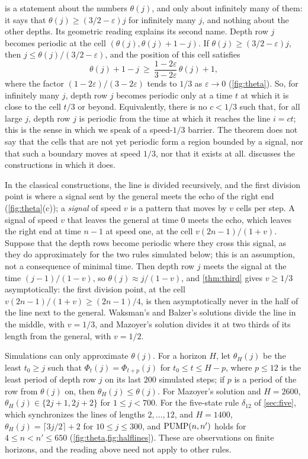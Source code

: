  is a statement about the numbers $\theta(j)$, and only about
infinitely many of them: it says that $\theta(j)\ge(3/2-\varepsilon)j$ for
infinitely many $j$, and nothing about the other depths. Its geometric reading
explains its second name. Depth row $j$ becomes periodic at the cell
$(\theta(j),\theta(j)+1-j)$. If $\theta(j)\ge(3/2-\varepsilon)j$, then
$j\le\theta(j)/(3/2-\varepsilon)$, and the position of this cell satisfies
\[
\theta(j)+1-j\ \ge\ \frac{1-2\varepsilon}{3-2\varepsilon}\,\theta(j)+1,
\]
where the factor $(1-2\varepsilon)/(3-2\varepsilon)$ tends to $1/3$ as
$\varepsilon\to0$ (\cref{fig:theta}). So, for infinitely many $j$, depth row $j$
becomes periodic only at a time $t$ at which it is close to the cell $t/3$ or
beyond. Equivalently, there is no $c<1/3$ such that, for all large $j$, depth
row $j$ is periodic from the time at which it reaches the line $i=ct$; this is
the sense in which we speak of a speed-$1/3$ barrier. The theorem does not say
that the cells that are not yet periodic form a region bounded by a signal, nor
that such a boundary moves at speed $1/3$, nor that it exists at all.
 discusses the constructions in which it does.

\begin{remark}\label{rem:division}
In the classical constructions, the line is divided recursively, and the first
division point is where a signal sent by the general meets the echo of the right
end (\cref{fig:theta}(c)); a \emph{signal} of speed $v$ is a pattern that moves by
$v$ cells per step. A signal of speed $v$ that leaves the general at time $0$
meets the echo, which leaves the right end at time $n-1$ at speed one, at the
cell $v(2n-1)/(1+v)$. Suppose that the depth rows become periodic where they
cross this signal, as they do approximately for the two rules simulated below;
this is an assumption, not a consequence of minimal time. Then depth row $j$ meets the
signal at the time $(j-1)/(1-v)$, so $\theta(j)\approx j/(1-v)$, and
\cref{thm:third} gives $v\ge1/3$ asymptotically: the first division point, at the
cell $v(2n-1)/(1+v)\ge(2n-1)/4$, is then asymptotically never in the half of the
line next to the general. Waksman's and Balzer's solutions divide the line in
the middle, with $v=1/3$, and Mazoyer's solution divides it at two thirds of its
length from the general, with $v=1/2$.

Simulations can only approximate $\theta(j)$. For a horizon $H$, let
$\theta_H(j)$ be the least $t_0\ge j$ such that $\Phi_t(j)=\Phi_{t+p}(j)$ for
$t_0\le t\le H-p$, where $p\le12$ is the least period of depth row $j$ on its
last $200$ simulated steps; if $p$ is a period of the row from $\theta(j)$ on,
then $\theta_H(j)\le\theta(j)$. For Mazoyer's solution and $H=2600$,
$\theta_H(j)\in\{2j+1,2j+2\}$ for $1\le j<700$. For the five-state rule
$\delta_{12}$ of \cref{sec:five}, which synchronizes the lines of lengths
$2,\dots,12$, and $H=1400$, $\theta_H(j)=\lceil 3j/2\rceil+2$ for $10\le
j\le300$, and $\mathrm{PUMP}(n,n')$ holds for $4\le n<n'\le650$
(\cref{fig:theta,fig:halflines}). These are observations on finite horizons,
and the reading above need not apply to other rules.
\end{remark}

